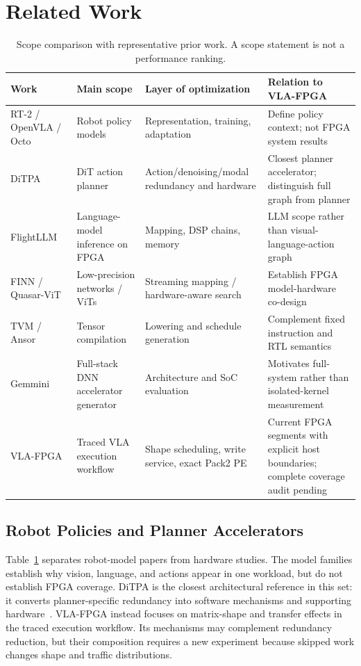 \documentclass[10pt,conference,letterpaper]{IEEEtran}
\begin{document}
\section{Related Work}
\begin{table}[t]\centering\caption{Scope comparison with representative prior work. A scope statement is not a performance ranking.}\label{tab:related}
\begin{tabular}{p{}p{}p{}p{}}\toprule
Work & Main scope & Layer of optimization & Relation to VLA-FPGA \\\midrule
RT-2 / OpenVLA / Octo~\cite{rt2,openvla,octo} & Robot policy models & Representation, training, adaptation & Define policy context; not FPGA system results \\
DiTPA~\cite{ditpa} & DiT action planner & Action/denoising/modal redundancy and hardware & Closest planner accelerator; distinguish full graph from planner \\
FlightLLM~\cite{flight} & Language-model inference on FPGA & Mapping, DSP chains, memory & LLM scope rather than visual-language-action graph \\
FINN / Quasar-ViT~\cite{finn,quasar} & Low-precision networks / ViTs & Streaming mapping / hardware-aware search & Establish FPGA model-hardware co-design \\
TVM / Ansor~\cite{tvm,ansor} & Tensor compilation & Lowering and schedule generation & Complement fixed instruction and RTL semantics \\
Gemmini~\cite{gemmini} & Full-stack DNN accelerator generator & Architecture and SoC evaluation & Motivates full-system rather than isolated-kernel measurement \\
VLA-FPGA & Traced VLA execution workflow & Shape scheduling, write service, exact Pack2 PE & Current FPGA segments with explicit host boundaries; complete coverage audit pending \\\bottomrule
\end{tabular}\end{table}

\subsection{Robot Policies and Planner Accelerators}
Table~\ref{tab:related} separates robot-model papers from hardware studies. The model families establish why vision, language, and actions appear in one workload, but do not establish FPGA coverage. DiTPA is the closest architectural reference in this set: it converts planner-specific redundancy into software mechanisms and supporting hardware~\cite{ditpa}. VLA-FPGA instead focuses on matrix-shape and transfer effects in the traced execution workflow. Its mechanisms may complement redundancy reduction, but their composition requires a new experiment because skipped work changes shape and traffic distributions.
\end{document}
